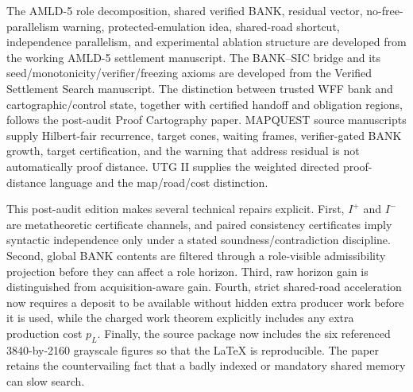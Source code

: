 \documentclass[11pt]{article}
\begin{document}
The AMLD-5 role decomposition, shared verified BANK, residual vector, no-free-parallelism warning, protected-emulation idea, shared-road shortcut, independence parallelism, and experimental ablation structure are developed from the working AMLD-5 settlement manuscript. The BANK--SIC bridge and its seed/monotonicity/verifier/freezing axioms are developed from the Verified Settlement Search manuscript. The distinction between trusted WFF bank and cartographic/control state, together with certified handoff and obligation regions, follows the post-audit Proof Cartography paper. MAPQUEST source manuscripts supply Hilbert-fair recurrence, target cones, waiting frames, verifier-gated BANK growth, target certification, and the warning that address residual is not automatically proof distance. UTG II supplies the weighted directed proof-distance language and the map/road/cost distinction.

This post-audit edition makes several technical repairs explicit. First, $I^+$ and $I^-$ are metatheoretic certificate channels, and paired consistency certificates imply syntactic independence only under a stated soundness/contradiction discipline. Second, global BANK contents are filtered through a role-visible admissibility projection before they can affect a role horizon. Third, raw horizon gain is distinguished from acquisition-aware gain. Fourth, strict shared-road acceleration now requires a deposit to be available without hidden extra producer work before it is used, while the charged work theorem explicitly includes any extra production cost $p_L$. Finally, the source package now includes the six referenced 3840-by-2160 grayscale figures so that the LaTeX is reproducible. The paper retains the countervailing fact that a badly indexed or mandatory shared memory can slow search.
\end{document}

